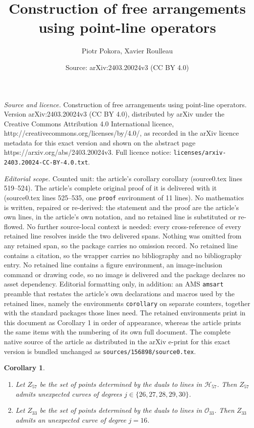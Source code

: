 \documentclass[10pt,a4paper]{amsart}
\title{Construction of free arrangements using point-line operators}
\author{Piotr Pokora, Xavier Roulleau}
\date{Source: arXiv:2403.20024v3 (CC BY 4.0)}
\newtheorem{corollary}{Corollary}
\begin{document}
\maketitle

\noindent\emph{Source and licence.} Construction of free arrangements using point-line operators. Version arXiv:2403.20024v3 (CC BY 4.0), distributed by arXiv under the Creative Commons Attribution 4.0 International licence, http://creativecommons.org/licenses/by/4.0/, as recorded in the arXiv licence metadata for this exact version and shown on the abstract page https://arxiv.org/abs/2403.20024v3. Full licence notice: \texttt{licenses/arxiv-2403.20024-CC-BY-4.0.txt}.\par\smallskip

\noindent\textit{Editorial scope.} Counted unit: the article's corollary corollary (source0.tex lines 519--524). The article's complete original proof of it is delivered with it (source0.tex lines 525--535, one \texttt{proof} environment of 11 lines). No mathematics is written, repaired or re-derived: the statement and the proof are the article's own lines, in the article's own notation, and no retained line is substituted or re-flowed.  No further source-local context is needed: every cross-reference of every retained line resolves inside the two delivered spans.  Nothing was omitted from any retained span, so the package carries no omission record.  No retained line contains a citation, so the wrapper carries no bibliography and no bibliography entry.  No retained line contains a figure environment, an image-inclusion command or drawing code, so no image is delivered and the package declares no asset dependency.  Editorial formatting only, in addition: an AMS \texttt{amsart} preamble that restates the article's own declarations and macros used by the retained lines, namely the environments \texttt{corollary} on separate counters, together with the standard packages those lines need.  The retained environments print in this document as Corollary 1 in order of appearance, whereas the article prints the same items with the numbering of its own full document.  The complete native source of the article as distributed in the arXiv e-print for this exact version is bundled unchanged as \texttt{sources/156898/source0.tex}.
\begin{corollary}
\begin{enumerate}
\item[a)] Let $Z_{57}$ be the set of points determined by the duals to lines in $\mathcal{H}_{57}$. Then $Z_{57}$ admits unexpected curves of degrees $j \in \{26, 27, 28, 29, 30\}$.
\item[b)] Let $Z_{33}$ be the set of points determined by the duals to lines in $\mathcal{O}_{33}$. Then $Z_{33}$ admits an unexpected curve of degree $j=16$.
\end{enumerate}
\end{corollary}
\end{document}
